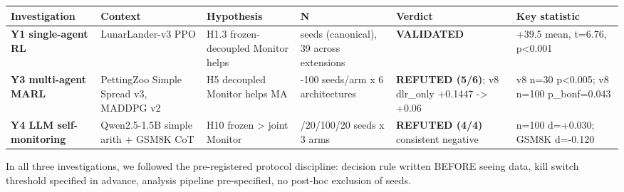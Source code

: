 \documentclass[11pt]{article}
\begin{document}
{\def\LTcaptype{none} %
\begin{longtable}[]{@{}
  >{\raggedright\arraybackslash}p{(\linewidth - 10\tabcolsep)}
  >{\raggedright\arraybackslash}p{(\linewidth - 10\tabcolsep)}
  >{\raggedright\arraybackslash}p{(\linewidth - 10\tabcolsep)}
  >{\raggedright\arraybackslash}p{(\linewidth - 10\tabcolsep)}
  >{\raggedright\arraybackslash}p{(\linewidth - 10\tabcolsep)}
  >{\raggedright\arraybackslash}p{(\linewidth - 10\tabcolsep)}@{}}
\toprule\noalign{}
\begin{minipage}[b]{\linewidth}\raggedright
Investigation
\end{minipage} & \begin{minipage}[b]{\linewidth}\raggedright
Context
\end{minipage} & \begin{minipage}[b]{\linewidth}\raggedright
Hypothesis
\end{minipage} & \begin{minipage}[b]{\linewidth}\raggedright
N
\end{minipage} & \begin{minipage}[b]{\linewidth}\raggedright
Verdict
\end{minipage} & \begin{minipage}[b]{\linewidth}\raggedright
Key statistic
\end{minipage} \\
\midrule\noalign{}
\endhead
\bottomrule\noalign{}
\endlastfoot
\textbf{Y1 single-agent RL} & LunarLander-v3 PPO & H1.3 frozen-decoupled
Monitor helps & 15 seeds (canonical), 39 across extensions &
\textbf{VALIDATED} & +39.5 mean, t=6.76, p\textless0.001 \\
\textbf{Y3 multi-agent MARL} & PettingZoo Simple Spread v3, MADDPG v2 &
H5 decoupled Monitor helps MA & 5-100 seeds/arm x 6 architectures &
\textbf{REFUTED (5/6)}; v8 dlr\_only +0.1447 -\textgreater{} +0.06 & v8
n=30 p\textless0.005; v8 n=100 p\_bonf=0.043 \\
\textbf{Y4 LLM self-monitoring} & Qwen2.5-1.5B simple arith + GSM8K CoT
& H10 frozen \textgreater{} joint Monitor & 5/20/100/20 seeds x 3 arms &
\textbf{REFUTED (4/4)} consistent negative & n=100 d=+0.030; GSM8K
d=-0.120 \\
\end{longtable}
}

In all three investigations, we followed the pre-registered protocol
discipline: decision rule written BEFORE seeing data, kill switch
threshold specified in advance, analysis pipeline pre-specified, no
post-hoc exclusion of seeds.
\end{document}
